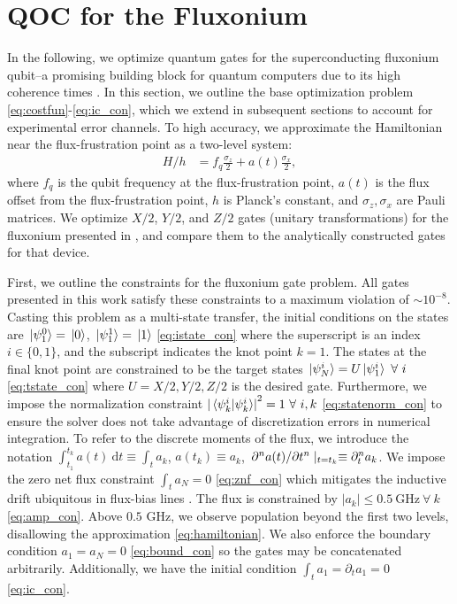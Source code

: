 \section{QOC for the Fluxonium \label{sec:fluxonium}}
In the following, we optimize quantum gates
for the superconducting fluxonium qubit--a promising
building block for quantum computers due to its high
coherence times
\cite{earnest2018realization, lin2018demonstration,
  manucharyan2009fluxonium, nguyen2019high,
  zhang2020universal}.
In this section, we outline the base optimization problem \eqref{eq:costfun}-\eqref{eq:ic_con},
which we extend in subsequent sections to account
for experimental error channels.
To high accuracy, we approximate the Hamiltonian near the flux-frustration
point as a two-level system:
\begin{align}
  H/h &= f_{q} \frac{\sigma_{z}}{2} + a(t) \frac{\sigma_{x}}{2},
  \label{eq:hamiltonian}
\end{align}
where $f_{q}$ is the qubit frequency at the flux-frustration point,
$a(t)$ is the flux offset from the flux-frustration point,
$h$ is Planck's constant, and $\sigma_{z}, \sigma_{x}$
are Pauli matrices. We optimize $X/2$,
$Y/2$, and $Z/2$ gates (unitary transformations)
for the fluxonium presented in \cite{zhang2020universal},
and compare them to the analytically constructed gates for
that device.

First, we outline the constraints for the fluxonium gate problem.
All gates presented in this work satisfy these constraints to
a maximum violation of $\sim 10^{-8}$.
Casting this problem as a multi-state transfer, the initial conditions on
the states are $\ket*{\psi^{0}_{1}} = \ket*{0}$, $\ket*{\psi^{1}_{1}} = \ket*{1}$
\eqref{eq:istate_con}
where the superscript is an index $i \in \{0, 1\}$,
and the subscript indicates the knot point $k = 1$.
The states at the final knot point are constrained to be
the target states $\ket*{\psi^{i}_{N}} = U \ket*{\psi^{i}_{1}} \ \forall \ i$
\eqref{eq:tstate_con} where $U = X/2, Y/2, Z/2$ is the desired gate.
Furthermore, we impose the normalization constraint
${\lvert \braket*{\psi^{i}_{k}}{\psi^{i}_{k}} \rvert}^{2} = 1 \ \forall \ i,k$
\eqref{eq:statenorm_con}
to ensure the solver does not take advantage of discretization errors in numerical integration.
To refer to the discrete moments of the flux, we introduce the notation
$\int^{t_{k}}_{t_{1}} a(t) \ \mathrm{d}t \equiv \int_{t} a_{k}$,
$a(t_{k}) \equiv a_{k}$,
$\pdv*[n]{a(t)}{t} \lvert_{t = t_{k}} \equiv \partial^{n}_{t} a_{k}$.
We impose the zero net flux constraint $\int_{t} a_{N} = 0$
\eqref{eq:znf_con}
which mitigates the inductive drift ubiquitous in flux-bias lines
\cite{battistel2019fast, krantz2019quantum, zhang2020universal}.
The flux is constrained by $\lvert a_{k} \rvert \leq 0.5 \ \textrm{GHz} \ \forall \ k$
\eqref{eq:amp_con}.
Above $0.5$ GHz, we observe population beyond the first two levels, disallowing the
approximation \eqref{eq:hamiltonian}.
We also enforce the boundary condition $a_{1} = a_{N} = 0$ \eqref{eq:bound_con}
so the gates may be concatenated arbitrarily. Additionally,
we have the initial condition $\int_{t} a_{1} = \partial_{t} a_{1} = 0$
\eqref{eq:ic_con}.

